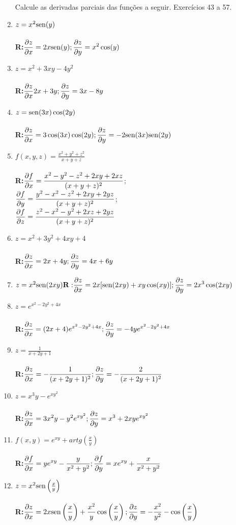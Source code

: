 \documentclass[oneside,a4paper,12pt]{article}
\newcommand{\sen}{{\rm sen}}
\newcommand{\R}{\\{\bf R:}}
\begin{document}
\begin{enumerate}
   Calcule as derivadas parciais das funções a seguir. Exercícios 43 a 57.
            \item $z = x^2\sen(y)$ \\ \R $\displaystyle \pdv{z}{x} = 2x\sen(y); \displaystyle \pdv{z}{y} = x^2\cos(y)$
            \item $z = x^2+3xy-4y^2$ \\ \R $\displaystyle \pdv{z}{x} 2x + 3y; \displaystyle \pdv{z}{y} = 3x - 8y$
            \item $z = \sen(3x)\cos(2y)$ \\ \R $\displaystyle \pdv{z}{x} = 3\cos(3x)\cos(2y); \displaystyle \pdv{z}{y} = -2\sen(3x)\sen(2y)$
            \item $f(x,y,z) = \displaystyle \frac{x^2 + y^2 + z^2}{x+y+z}$ \\ \R $\displaystyle \pdv{f}{x} = \frac{x^2-y^2-z^2+2xy+2xz}{(x+y+z)^2}$;\\
            $\displaystyle \pdv{f}{y}=\frac{y^2-x^2-z^2+2xy+2yz}{(x+y+z)^2}$;\\
            $\displaystyle \pdv{f}{z} = \frac{z^2-x^2-y^2+2xz+2yz}{(x+y+z)^2}$
            \item $z = x^2+3y^2+4xy+4$ \\ \R $\displaystyle \pdv{z}{x} = 2x+4y; \displaystyle \pdv{z}{y} = 4x+6y$
            \item $z = x^2\sen(2xy) \\ \R \displaystyle \pdv{z}{x} = 2x[\sen(2xy)+xy\cos(xy)]; \displaystyle \pdv{z}{y} = 2x^3\cos(2xy)$
            \item $z=e^{x^2-2y^2+4x}$ \\\R $\displaystyle \pdv{z}{x} = (2x+4)e^{x^2-2y^2+4x};\displaystyle \pdv{z}{y} = -4ye^{x^2-2y^2+4x}$
            \item $\displaystyle z = \frac{1}{x+2y+1}$ \\\R $\displaystyle \pdv{z}{x} = - \frac{1}{(x+2y+1)^2}; \displaystyle \pdv{z}{y} = - \frac{2}{(x+2y+1)^2}$
            \item $z = x^3y-e^{xy^2}$ \\\R $\displaystyle \pdv{z}{x} = 3x^2y-y^2e^{xy^2}; \displaystyle \pdv{z}{y} = x^3+2xye^{xy^2}$
            \item $f(x,y) = e^{xy}+artg\left(\frac{x}{y}\right)$ \\ \R $\displaystyle \pdv{f}{x} = ye^{xy} - \frac{y}{x^2+y^2}; \displaystyle \pdv{f}{y} = xe^{xy} + \frac{x}{x^2+y^2}$
            \item $z = x^2\sen\left(\frac{x}{y}\right)$\\\R $\displaystyle \pdv{z}{x} = 2x\sen\left(\frac{x}{y}\right)+\frac{x^2}{y}\cos\left(\frac{x}{y}\right); \displaystyle \pdv{z}{y} = - \frac{x^2}{y^2}-\cos\left(\frac{x}{y}\right)$

\end{enumerate}
\end{document}
